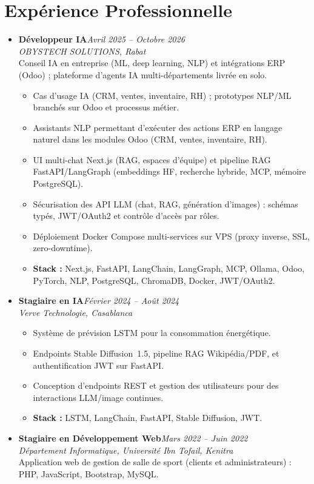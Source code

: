 \documentclass[10pt,a4paper]{article}
\newcommand{\role}[2]{\textbf{#1}\hfill\textit{\color{muted}#2}\\}
\newcommand{\org}[1]{\textit{#1}\\[0.5pt]}
\begin{document}
\section*{Expérience Professionnelle}
\begin{itemize}
    \item \role{Développeur IA}{Avril 2025 -- Octobre 2026}
          \org{OBYSTECH SOLUTIONS, Rabat}
          Conseil IA en entreprise (ML, deep learning, NLP) et intégrations ERP (Odoo) ; plateforme d'agents IA multi-départements livrée en solo.
          \begin{itemize}
              \item Cas d'usage IA (CRM, ventes, inventaire, RH) ; prototypes NLP/ML branchés sur Odoo et processus métier.
              \item Assistants NLP permettant d'exécuter des actions ERP en langage naturel dans les modules Odoo (CRM, ventes, inventaire, RH).
              \item UI multi-chat Next.js (RAG, espaces d'équipe) et pipeline RAG FastAPI/LangGraph (embeddings HF, recherche hybride, MCP, mémoire PostgreSQL).
              \item Sécurisation des API LLM (chat, RAG, génération d'images) : schémas typés, JWT/OAuth2 et contrôle d'accès par rôles.
              \item Déploiement Docker Compose multi-services sur VPS (proxy inverse, SSL, zero-downtime).
              \item \textbf{Stack :} Next.js, FastAPI, LangChain, LangGraph, MCP, Ollama, Odoo, PyTorch, NLP, PostgreSQL, ChromaDB, Docker, JWT/OAuth2.
          \end{itemize}

    \item \role{Stagiaire en IA}{Février 2024 -- Août 2024}
          \org{Verve Technologie, Casablanca}
          \begin{itemize}
              \item Système de prévision LSTM pour la consommation énergétique.
              \item Endpoints Stable Diffusion~1.5, pipeline RAG Wikipédia/PDF, et authentification JWT sur FastAPI.
              \item Conception d'endpoints REST et gestion des utilisateurs pour des interactions LLM/image continues.
              \item \textbf{Stack :} LSTM, LangChain, FastAPI, Stable Diffusion, JWT.
          \end{itemize}

    \item \role{Stagiaire en Développement Web}{Mars 2022 -- Juin 2022}
          \org{Département Informatique, Université Ibn Tofail, Kenitra}
          Application web de gestion de salle de sport (clients et administrateurs) : PHP, JavaScript, Bootstrap, MySQL.
\end{itemize}
\end{document}
